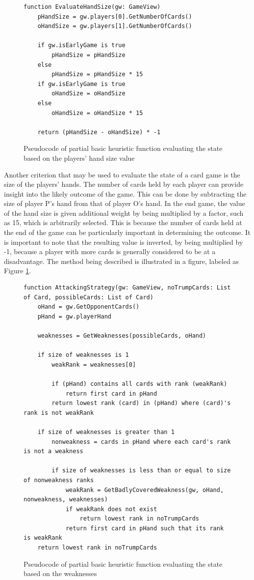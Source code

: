 \begin{figure}[h]
\captionsetup{justification=centering}
\begin{lstlisting}
function EvaluateHandSize(gw: GameView)
    pHandSize = gw.players[0].GetNumberOfCards()
    oHandSize = gw.players[1].GetNumberOfCards()

    if gw.isEarlyGame is true
        pHandSize = pHandSize
    else
        pHandSize = pHandSize * 15
    if gw.isEarlyGame is true
        oHandSize = oHandSize
    else
        oHandSize = oHandSize * 15

    return (pHandSize - oHandSize) * -1
\end{lstlisting}
\caption{Pseudocode of partial basic heuristic function evaluating the state based on the players' hand size value}
\label{fig:BHPlayerHandSize}
\end{figure}

Another criterion that may be used to evaluate the state of a card game is the size of the players' hands. The number of cards held by each player can provide insight into the likely outcome of the game. This can be done by subtracting the size of player P's hand from that of player O's hand. In the end game, the value of the hand size is given additional weight by being multiplied by a factor, such as 15, which is arbitrarily selected. This is because the number of cards held at the end of the game can be particularly important in determining the outcome. It is important to note that the resulting value is inverted, by being multiplied by -1, because a player with more cards is generally considered to be at a disadvantage. The method being described is illustrated in a figure, labeled as Figure \ref{fig:BHPlayerHandSize}.

\begin{figure}[h]
\captionsetup{justification=centering}
\begin{lstlisting}
function AttackingStrategy(gw: GameView, noTrumpCards: List of Card, possibleCards: List of Card)
    oHand = gw.GetOpponentCards()
    pHand = gw.playerHand
    
    weaknesses = GetWeaknesses(possibleCards, oHand)
    
    if size of weaknesses is 1
        weakRank = weaknesses[0]

        if (pHand) contains all cards with rank (weakRank)
            return first card in pHand  
        return lowest rank (card) in (pHand) where (card)'s rank is not weakRank
        		
    if size of weaknesses is greater than 1
        nonweakness = cards in pHand where each card's rank is not a weakness
        
        if size of weaknesses is less than or equal to size of nonweakness ranks
            weakRank = GetBadlyCoveredWeakness(gw, oHand, nonweakness, weaknesses)
            if weakRank does not exist
                return lowest rank in noTrumpCards
            return first card in pHand such that its rank is weakRank
    return lowest rank in noTrumpCards
\end{lstlisting}
\caption{Pseudocode of partial basic heuristic function evaluating the state based on the weaknesses}
\label{fig:BHWeakness}
\end{figure}

